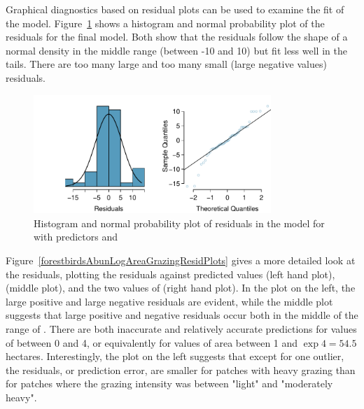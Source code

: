 Graphical diagnostics based on residual plots can be used to examine the fit of the model.  Figure~\ref{forestbirdsAbunLogAreaGrazingNormPlots} shows a histogram and normal probability plot of the residuals for the final model.  Both show that the residuals follow the shape of a normal density in the middle range (between -10 and 10) but fit less well in the tails.  There are too many large and too many small (large negative values) residuals.

 \begin{figure}[h!]
 	\centering
 	\includegraphics[width=0.8\textwidth]
{ch_multiple_linear_regression_oi_biostat/figures/forestbirdsAbunLogAreaGrazingNormPlots/forestbirdsAbunLogAreaGrazingNormPlots.pdf}
     \caption{Histogram and normal probability plot of residuals in the model for  with predictors  and }
    	\label{forestbirdsAbunLogAreaGrazingNormPlots}
 \end{figure}

Figure~\ref{forestbirdsAbunLogAreaGrazingResidPlots} gives a more detailed look at the residuals, plotting the residuals against predicted values (left hand plot),  (middle plot), and the two values of  (right hand plot).  In the plot on the left, the large positive and large negative residuals are evident, while the middle plot suggests that large positive and negative residuals occur both in the middle of the range of .  There are both inaccurate and relatively accurate predictions for values of  between 0 and 4, or equivalently for values of area between 1 and $\exp{4} = 54.5$ hectares.  Interestingly, the plot on the left suggests that except for one outlier, the residuals, or prediction error, are smaller for patches with heavy grazing than for patches where the grazing intensity was between "light" and "moderately heavy".

